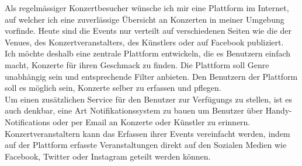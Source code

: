 Als regelmässiger Konzertbesucher wünsche ich mir eine Plattform im
Internet, auf welcher ich eine zuverlässige Übersicht an Konzerten in
meiner Umgebung vorfinde. Heute sind die Events nur verteilt auf
verschiedenen Seiten wie die der Venues, des Konzertveranstalters, des
Künstlers oder auf Facebook publiziert.\\

Ich möchte deshalb eine zentrale Plattform entwickeln, die es Benutzern
einfach macht, Konzerte für ihren Geschmack zu finden.
Die Plattform soll Genre unabhängig sein und entsprechende Filter anbieten.
Den Benutzern der Plattform soll es möglich sein, Konzerte selber zu
erfassen und pflegen.\\

Um einen zusätzlichen Service für den Benutzer zur Verfügungs zu stellen,
ist es auch denkbar, eine Art Notifikationssystem zu bauen um Benutzer
über Handy-Notifications oder per Email an Konzerte oder Künstler zu
erinnern.\\

Konzertveranstaltern kann das Erfassen ihrer Events vereinfacht werden,
indem auf der Plattform erfasste Veranstaltungen direkt auf den Sozialen
Medien wie Facebook, Twitter oder Instagram geteilt werden können.
